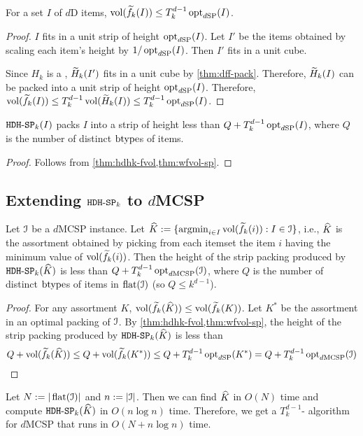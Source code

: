 \begin{theorem}
\label{thm:wfvol-sp}
For a set $I$ of $d$D items, $\operatorname{vol}(\widetilde{f}_{k}(I)) \le T_k^{d-1} \operatorname{opt}_{d\mathrm{SP}}(I)$.
\end{theorem}
\begin{proof}
$I$ fits in a unit strip of height $\operatorname{opt}_{d\mathrm{SP}}(I)$.
Let $I'$ be the items obtained by scaling each item's height by $1/\operatorname{opt}_{d\mathrm{SP}}(I)$.
Then $I'$ fits in a unit cube.

Since $H_k$ is a \dff{}, $\widetilde{H}_{k}(I')$ fits in a unit cube by \cref{thm:dff-pack}.
Therefore, $\widetilde{H}_{k}(I)$ can be packed into a unit strip of height $\operatorname{opt}_{d\mathrm{SP}}(I)$.
Therefore, $\operatorname{vol}(\widetilde{f}_{k}(I)) \le T_k^{d-1}\operatorname{vol}(\widetilde{H}_{k}(I)) \le T_k^{d-1}\operatorname{opt}_{d\mathrm{SP}}(I)$.
\end{proof}

\begin{corollary}
\label{thm:hdhk-sp-appx}
$\operatorname{\mathtt{HDH-SP}}_{k}(I)$ packs $I$ into a strip of height less than $Q + T_k^{d-1}\operatorname{opt}_{d\mathrm{SP}}(I)$,
where $Q$ is the number of distinct $\operatorname{btype}$s of items.
\end{corollary}
\begin{proof} Follows from \cref{thm:hdhk-fvol,thm:wfvol-sp}. \end{proof}

\subsection{Extending \texorpdfstring{$\operatorname{\mathtt{HDH-SP}}_{k}$ to $d$MCSP}{HDH-SP to dMCSP}}
\label{sec:hdhk-mcsp}

\begin{theorem}
Let $\mathcal{I}$ be a $d$MCSP instance.
Let $\widehat{K} := \{\operatorname*{argmin}_{i \in I} \operatorname{vol}(\widetilde{f}_{k}(i)): I \in \mathcal{I}\}$,
i.e., $\widehat{K}$ is the assortment obtained by picking from each itemset
the item $i$ having the minimum value of $\operatorname{vol}(\widetilde{f}_{k}(i))$.
Then the height of the strip packing produced by $\operatorname{\mathtt{HDH-SP}}_{k}(\widehat{K})$
is less than $Q + T_k^{d-1}\operatorname{opt}_{d\mathrm{MCSP}}(\mathcal{I})$,
where $Q$ is the number of distinct $\operatorname{btype}$s of items in $\operatorname{flat}(\mathcal{I})$
(so $Q \le k^{d-1}$).
\end{theorem}
\begin{proof}
For any assortment $K$, $\operatorname{vol}(\widetilde{f}_{k}(\widehat{K})) \le \operatorname{vol}(\widetilde{f}_{k}(K))$.
Let $K^*$ be the assortment in an optimal packing of $\mathcal{I}$.
By \cref{thm:hdhk-fvol,thm:wfvol-sp}, the height of the strip packing produced by
$\operatorname{\mathtt{HDH-SP}}_{k}(\widehat{K})$ is less than
\[ Q + \operatorname{vol}(\widetilde{f}_{k}(\widehat{K}))
\le Q + \operatorname{vol}(\widetilde{f}_{k}(K^*))
\le Q + T_k^{d-1}\operatorname{opt}_{d\mathrm{SP}}(K^*)
= Q + T_k^{d-1}\operatorname{opt}_{d\mathrm{MCSP}}(\mathcal{I}) \qedhere \]
\end{proof}

Let $N := |\operatorname{flat}(\mathcal{I})|$ and $n := |\mathcal{I}|$.
Then we can find $\widehat{K}$ in $O(N)$ time and compute $\operatorname{\mathtt{HDH-SP}}_{k}(\widehat{K})$ in $O(n\log n)$ time.
Therefore, we get a $T_k^{d-1}$-\asymAppx{} algorithm for $d$MCSP
that runs in $O(N + n\log n)$ time.
